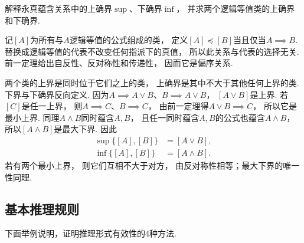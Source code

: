 \begin{example}
    解释永真蕴含关系中的上确界\(\sup\)、下确界\(\inf\)，
    并求两个逻辑等值类的上确界和下确界.
    \begin{solution}
        记\([A]\)为所有与\(A\)逻辑等值的公式组成的类，
        定义\([A]\preccurlyeq[B]\)当且仅当\(A\implies B\).
        替换成逻辑等值的代表不改变任何指派下的真值，
        所以此关系与代表的选择无关.
        前一定理给出自反性、反对称性和传递性，
        因而它是偏序关系.

        两个类的上界是同时位于它们之上的类，
        上确界是其中不大于其他任何上界的类.
        下界与下确界反向定义.
        因为\(A\implies A\lor B\)、\(B\implies A\lor B\)，
        \([A\lor B]\)是上界.
        若\([C]\)是任一上界，
        则\(A\implies C\)、\(B\implies C\)，
        由前一定理得\(A\lor B\implies C\)，
        所以它是最小上界.
        同理\(A\land B\)同时蕴含\(A,B\)，
        且任一同时蕴含\(A,B\)的公式也蕴含\(A\land B\)，
        所以\([A\land B]\)是最大下界.
        因此
        \begin{align*}
            \sup\{[A],[B]\} &= [A\lor B], \\
            \inf\{[A],[B]\} &= [A\land B].
        \end{align*}
        若有两个最小上界，
        则它们互相不大于对方，
        由反对称性相等；最大下界的唯一性同理.
    \end{solution}
\end{example}

\subsection{基本推理规则}
下面举例说明，证明推理形式有效性的4种方法.

